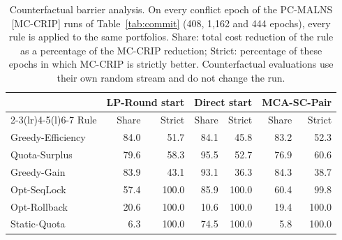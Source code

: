 \begin{table}[pos=!htb]
\centering
\caption{Counterfactual barrier analysis. On every conflict epoch of the PC-MALNS [MC-CRIP] runs of Table~\ref{tab:commit} (408, 1,162 and 444 epochs), every rule is applied to the same portfolios. Share: total cost reduction of the rule as a percentage of the MC-CRIP reduction; Strict: percentage of these epochs in which MC-CRIP is strictly better. Counterfactual evaluations use their own random stream and do not change the run.}
\label{tab:counterfactual}
\footnotesize
\begin{tabular}{@{}lrrrrrr@{}}
\toprule
 & \multicolumn{2}{c}{LP-Round start} & \multicolumn{2}{c}{Direct start} & \multicolumn{2}{c}{MCA-SC-Pair} \\
\cmidrule(lr){2-3}\cmidrule(lr){4-5}\cmidrule(l){6-7}
Rule & Share & Strict & Share & Strict & Share & Strict \\
\midrule
Greedy-Efficiency & 84.0 & 51.7 & 84.1 & 45.8 & 83.2 & 52.3 \\
Quota-Surplus & 79.6 & 58.3 & 95.5 & 52.7 & 76.9 & 60.6 \\
Greedy-Gain & 83.9 & 43.1 & 93.1 & 36.3 & 84.3 & 38.7 \\
Opt-SeqLock & 57.4 & 100.0 & 85.9 & 100.0 & 60.4 & 99.8 \\
Opt-Rollback & 20.6 & 100.0 & 10.6 & 100.0 & 19.4 & 100.0 \\
Static-Quota & 6.3 & 100.0 & 74.5 & 100.0 & 5.8 & 100.0 \\
\bottomrule
\end{tabular}
\end{table}
